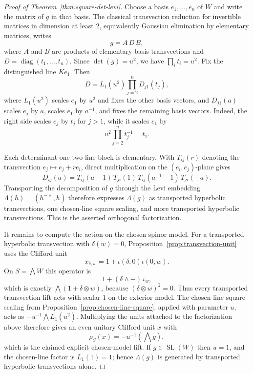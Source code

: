 \documentclass{birkjour}
\theoremstyle{plain}
\theoremstyle{definition}
\theoremstyle{remark}
\numberwithin{equation}{section}
\begin{document}
\begin{proof}[Proof of Theorem~\ref{thm:square-det-levi}]
Choose a basis \(e_1,\ldots,e_n\) of $W$ and write the matrix of $g$ in that
basis. The classical transvection reduction for invertible matrices in dimension
at least \(2\), equivalently Gaussian elimination by elementary matrices, writes
\[
  g=A\,D\,B,
\]
where \(A\) and \(B\) are products of elementary basis transvections and
\(D=\operatorname{diag}(t_1,\ldots,t_n)\). Since \(\det(g)=u^2\), we have
\(\prod_i t_i=u^2\). Fix the distinguished line \(Ke_1\). Then
\[
  D=L_1(u^2)\prod_{j=2}^n D_{j1}(t_j),
\]
where \(L_1(u^2)\) scales \(e_1\) by \(u^2\) and fixes the other basis vectors,
and \(D_{j1}(a)\) scales \(e_j\) by \(a\), scales \(e_1\) by \(a^{-1}\), and
fixes the remaining basis vectors. Indeed, the right side scales \(e_j\) by
\(t_j\) for \(j>1\), while it scales \(e_1\) by
\[
  u^2\prod_{j=2}^n t_j^{-1}=t_1.
\]

Each determinant-one two-line block is elementary. With \(T_{ij}(r)\) denoting
the transvection \(e_j\mapsto e_j+r e_i\), direct multiplication on the
\((e_i,e_j)\)-plane gives
\[
  D_{ij}(a)=
  T_{ij}(a-1)\,T_{ji}(1)\,T_{ij}(a^{-1}-1)\,T_{ji}(-a).
\]
Transporting the decomposition of \(g\) through the Levi embedding
\(\Lambda(h)=(h^{-{\vee}},h)\) therefore expresses \(\Lambda(g)\) as transported
hyperbolic transvections, one chosen-line square scaling, and more transported
hyperbolic transvections. This is the asserted orthogonal factorization.

It remains to compute the action on the chosen spinor model. For a transported
hyperbolic transvection with \(\delta(w)=0\), Proposition~\ref{prop:transvection-unit}
uses the Clifford unit
\[
  x_{\delta,w}=1+\iota(\delta,0)\iota(0,w).
\]
On \(S=\bigwedge W\) this operator is
\[
  1+(\delta\wedge -)\,\iota_w,
\]
which is exactly \(\bigwedge(1+\delta\otimes w)\), because
\((\delta\otimes w)^2=0\). Thus every transported transvection lift acts with
scalar \(1\) on the exterior model. The chosen-line square scaling
from Proposition~\ref{prop:chosen-line-square}, applied with parameter \(u\),
acts as \(-u^{-1}\bigwedge L_1(u^2)\). Multiplying the units attached to the
factorization above therefore gives an even unitary Clifford unit \(x\) with
\[
  \rho_S(x)=-u^{-1}(\bigwedge g),
\]
which is the claimed explicit chosen-model lift. If \(g\in\operatorname{SL}(W)\)
then \(u=1\), and the chosen-line factor is \(L_1(1)=1\); hence
\(\Lambda(g)\) is generated by transported hyperbolic transvections alone.
\end{proof}
\end{document}
